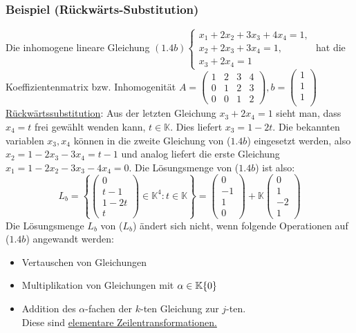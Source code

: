 \subsubsection{Beispiel (Rückwärts-Substitution)}
Die inhomogene lineare Gleichung $(1.4b)\begin{cases}x_1+2x_2+3x_3+4x_4=1,\\ x_2+2x_3+3x_4=1,\\x_3+2x_4=1\end{cases}$ hat die Koeffizientenmatrix bzw. Inhomogenität $A=\left(\begin{array}{cccc}1 & 2 & 3 & 4 \\ 0 & 1 & 2 & 3\\ 0 & 0 & 1 & 2\end{array}\right), b=\left(\begin{array}{c}1\\ 1\\ 1\\\end{array}\right)$\\
\underline{Rückwärtssubstitution}: Aus der letzten Gleichung $x_3+2x_4=1$ sieht man, dass $x_4=t$ frei gewählt wenden kann, $t\in \mathbb{K}$.  Dies liefert $x_3=1-2t$.  Die bekannten variablen $x_3,x_4$ können in die zweite Gleichung von ($1.4b$) eingesetzt werden, also $x_2 = 1-2x_3-3x_4=t-1$ und analog liefert die erste Gleichung $x_1=1-2x_2-3x_3-4x_4=0$.  Die Lösungsmenge von ($1.4b$) ist also:\[L_b=\left\{\left(\begin{array}{c}0\\ t-1\\ 1-2t\\ t\end{array}\right)\in \mathbb{K}^4:t\in\mathbb{K}\right\} = \left(\begin{array}{c}0\\ -1\\ 1\\ 0\end{array}\right)+\mathbb{K}\left(\begin{array}{c}0\\ 1\\ -2 \\1\end{array}\right)\]
Die Lösungsmenge $L_b$ von ($L_b$) ändert sich nicht, wenn folgende Operationen auf ($1.4b$) angewandt werden:
\begin{itemize}
\item Vertauschen von Gleichungen
\item Multiplikation von Gleichungen mit $\alpha \in \mathbb{K}\\\{0\}$
\item Addition des $\alpha$-fachen der $k$-ten Gleichung zur $j$-ten.\\
Diese sind \underline{elementare Zeilentransformationen.}
\end{itemize}
